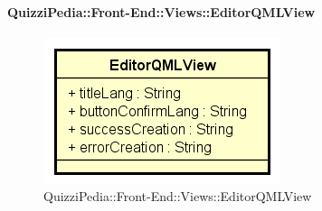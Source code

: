 \paragraph{QuizziPedia::Front-End::Views::EditorQMLView}
\begin{figure} [ht]
	\centering
	\includegraphics[scale=0.80]{UML/Classi/Front-End/QuizziPedia_Front-end_EditorQMLView.png}
	\caption{QuizziPedia::Front-End::Views::EditorQMLView}
\end{figure} \FloatBarrier
